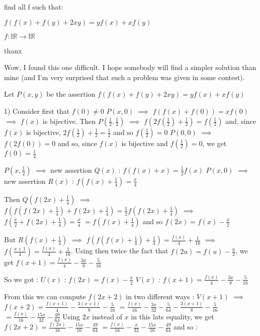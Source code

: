 \begin{solution}
	\begin{tcolorbox}find all f such that:

$ f(f(x) + f(y) + 2xy) = yf(x) + xf(y)$

$ f: \mathbb{IR}\to\mathbb{IR}$

thanx\end{tcolorbox}

Wow, I found this one difficult. I hope somebody will find a simpler solution than mine (and I'm very surprised that such a problem was given in some contest).

Let $ P(x,y)$ be the assertion $ f(f(x)+f(y)+2xy)=yf(x)+xf(y)$


1) Consider first that $ f(0)\neq 0$
$ P(x,0)$ $ \implies$ $ f(f(x)+f(0))=xf(0)$ $ \implies$ $ f(x)$ is bijective.
Then $ P(\frac 12,\frac 12)$ $ \implies$ $ f(2f(\frac 12)+\frac 12)=f(\frac 12)$ and, since $ f(x)$ is bijective, $ 2f(\frac 12)+\frac 12 =\frac 12$ and so $ f(\frac 12)=0$
$ P(0,0)$ $ \implies$ $ f(2f(0))=0$ and so, since $ f(x)$ is bijective and $ f(\frac 12)=0$, we get $ f(0)=\frac 14$


$ P(x,\frac 12)$ $ \implies$ new assertion $ Q(x)$ : $ f(f(x)+x)=\frac 12f(x)$
$ P(x,0)$ $ \implies$ new assertion $ R(x)$ : $ f(f(x)+\frac 14)=\frac x4$

Then $ Q(f(2x)+\frac 14)$ $ \implies$ $ f(f(f(2x)+\frac 14)+f(2x)+\frac 14)=\frac 12f(f(2x)+\frac 14)$ $ \implies$ $ f(\frac x2+f(2x)+\frac 14)=\frac x4$ $ =f(f(x)+\frac 14)$ and so $ f(2x)=f(x)-\frac x2$

But $ R(f(x)+\frac 14)$ $ \implies$ $ f(f(f(x)+\frac 14)+\frac 14)=\frac {f(x)}4+\frac 1{16}$ $ \implies$ $ f(\frac {x+1}4)=\frac {f(x)}4+\frac 1{16}$. Using then twice the fact that $ f(2u)=f(u)-\frac u2$, we get $ f(x+1)=\frac{f(x)}4-\frac{3x}8-\frac 5{16}$

So we got :
$ U(x)$ : $ f(2x)=f(x)-\frac x2$
$ V(x)$ : $ f(x+1)=\frac{f(x)}4-\frac{3x}8-\frac 5{16}$

From this we can compute $ f(2x+2)$ in two different ways :
$ V(x+1)$ $ \implies$ $ f(x+2)=\frac{f(x+1)}4-\frac{3(x+1)}8-\frac 5{16}$ $ =\frac{f(x)}{16}-\frac{3x}{32}-\frac 5{64}-\frac{3(x+1)}8-\frac 5{16}$ $ =\frac{f(x)}{16}-\frac{15x}{32}-\frac {49}{64}$
Using $ 2x$ instead of $ x$ in this lats equality, we get $ f(2x+2)=\frac{f(2x)}{16}-\frac{15x}{16}-\frac {49}{64}$ $ =\frac{f(x)}{16}-\frac {x}{32}-\frac{15x}{16}-\frac {49}{64}$ and so :


\end{solution}
